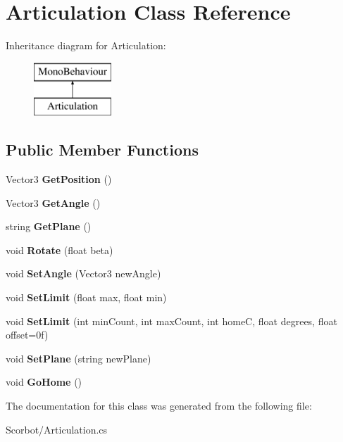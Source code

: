 \hypertarget{class_articulation}{}\section{Articulation Class Reference}
\label{class_articulation}
Inheritance diagram for Articulation\+:\begin{figure}[H]
\begin{center}
\leavevmode
\includegraphics[height=2.000000cm]{class_articulation}
\end{center}
\end{figure}
\subsection*{Public Member Functions}
\begin{DoxyCompactItemize}
\item 
\mbox{\label{class_articulation_a1a7ef254573e5d539a24d6ce58f93911}} 
Vector3 {\bfseries Get\+Position} ()
\item 
\mbox{\label{class_articulation_af80ebaf44266ca6e4042b23d3a3392c9}} 
Vector3 {\bfseries Get\+Angle} ()
\item 
\mbox{\label{class_articulation_ac22a47cd879d9867137cf705070dfb7b}} 
string {\bfseries Get\+Plane} ()
\item 
\mbox{\label{class_articulation_ab2d859587ba4c1993fe9ed41bc3834bc}} 
void {\bfseries Rotate} (float beta)
\item 
\mbox{\label{class_articulation_a5091b1cabb19fb26e8937857bf0a3ac5}} 
void {\bfseries Set\+Angle} (Vector3 new\+Angle)
\item 
\mbox{\label{class_articulation_ac3ed162898a61f33eb8b9e74c9e46389}} 
void {\bfseries Set\+Limit} (float max, float min)
\item 
\mbox{\label{class_articulation_ab720697712b16b9ed195dd4ba34a01d4}} 
void {\bfseries Set\+Limit} (int min\+Count, int max\+Count, int homeC, float degrees, float offset=0f)
\item 
\mbox{\label{class_articulation_abc1e52ec4c3370c2b8dd20b257c437ac}} 
void {\bfseries Set\+Plane} (string new\+Plane)
\item 
\mbox{\label{class_articulation_a40f0e6b38dd112843a1c16c817776391}} 
void {\bfseries Go\+Home} ()
\end{DoxyCompactItemize}


The documentation for this class was generated from the following file\+:\begin{DoxyCompactItemize}
\item 
Scorbot/Articulation.\+cs\end{DoxyCompactItemize}
